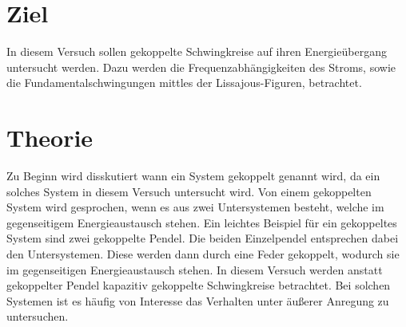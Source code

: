 \section{Ziel}
\label{sec:Ziel}
In diesem Versuch sollen gekoppelte Schwingkreise auf ihren Energieübergang untersucht werden. Dazu werden die Frequenzabhängigkeiten des Stroms, sowie die Fundamentalschwingungen mittles der Lissajous-Figuren,
betrachtet.
\section{Theorie}
\label{sec:Theorie}
Zu Beginn wird disskutiert wann ein System gekoppelt genannt wird, da ein solches System in diesem Versuch untersucht wird. Von einem gekoppelten System wird gesprochen, wenn es aus zwei Untersystemen
besteht, welche im gegenseitigem Energieaustausch stehen. Ein leichtes Beispiel für ein gekoppeltes System sind zwei gekoppelte Pendel. Die beiden Einzelpendel entsprechen dabei den Untersystemen.
Diese werden dann durch eine Feder gekoppelt, wodurch sie im gegenseitigen Energieaustausch stehen. In diesem Versuch werden anstatt gekoppelter Pendel kapazitiv gekoppelte Schwingkreise betrachtet.
Bei solchen Systemen ist es häufig von Interesse das Verhalten unter äußerer Anregung zu untersuchen.
